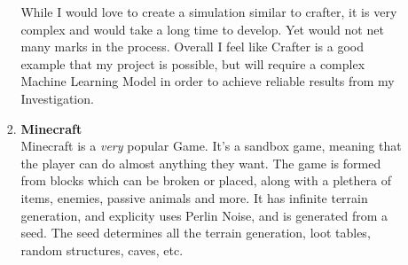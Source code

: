 \begin{flushleft}
\begin{enumerate}
\begin{enumerate}
\begin{enumerate}
                            \vspace{0.2cm}
                            \begin{figure}
                                \centering
                                \qquad
                            \end{figure}
                            \vspace{0.2cm}

                            While I would love to create a simulation similar to crafter, it is very complex and would take a long time to develop. Yet
                            would not net many marks in the process. Overall I feel like Crafter is a good example that my project is possible, but will
                            require a complex Machine Learning Model in order to achieve reliable results from my Investigation.

                        \vspace{1cm}
                        \item {\Large \textbf{Minecraft}} \\
                            \vspace{0.2cm}
                            Minecraft is a \textit{very} popular Game. It's a sandbox game, meaning that the player can do almost anything they want.
                            The game is formed from blocks which can be broken or placed, along with a plethera of items, enemies, passive animals
                            and more. It has infinite terrain generation, and explicity uses Perlin Noise, and is generated from a seed. The seed determines
                            all the terrain generation, loot tables, random structures, caves, etc. \\
                            

\end{enumerate}
\end{enumerate}
\end{enumerate}
\end{flushleft}
